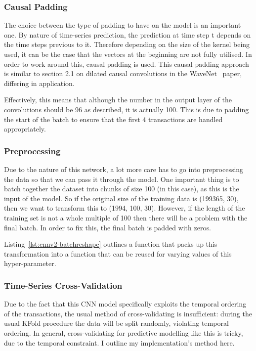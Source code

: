 \documentclass[12pt,a4paper,twoside]{report}
\begin{document}
\subsubsection{Causal Padding}
The choice between the type of padding to have on the model is an important one. By nature of time-series prediction, the prediction at time step t depends on the time steps previous to it. Therefore depending on the size of the kernel being used, it can be the case that the vectors at the beginning are not fully utilised. In order to work around this, causal padding is used. This causal padding approach is similar to section 2.1 on dilated causal convolutions in the WaveNet~\cite{DBLP:journals/corr/OordDZSVGKSK16} paper, differing in application. 

Effectively, this means that although the number in the output layer of the convolutions should be 96 as described, it is actually 100. This is due to padding the start of the batch to ensure that the first 4 transactions are handled appropriately. 

\subsubsection{Preprocessing}

Due to the nature of this network, a lot more care has to go into preprocessing the data so that we can pass it through the model. One important thing is to batch together the dataset into chunks of size 100 (in this case), as this is the input of the model. So if the original size of the training data is (199365, 30), then we want to transform this to (1994, 100, 30). However, if the length of the training set is not a whole multiple of 100 then there will be a problem with the final batch. In order to fix this, the final batch is padded with zeros. 

Listing~\ref{lst:cnnv2-batchreshape} outlines a function that packs up this transformation into a function that can be reused for varying values of this hyper-parameter.



\subsubsection{Time-Series Cross-Validation}

Due to the fact that this CNN model specifically exploits the temporal ordering of the transactions, the usual method of cross-validating is insufficient: during the usual KFold procedure the data will be split randomly, violating temporal ordering. In general, cross-validating for predictive modelling like this is tricky, due to the temporal constraint. I outline my implementation's method here.
\end{document}
